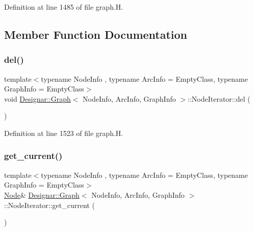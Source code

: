 Definition at line 1485 of file graph.\+H.



\subsection{Member Function Documentation}
\mbox{\label{class_designar_1_1_graph_1_1_node_iterator_a8ff7d2de6b10d3fd60774db675340259}} 
\subsubsection{\texorpdfstring{del()}{del()}}
{\footnotesize\ttfamily template$<$typename Node\+Info , typename Arc\+Info  = Empty\+Class, typename Graph\+Info  = Empty\+Class$>$ \\
void \hyperlink{class_designar_1_1_graph}{Designar\+::\+Graph}$<$ Node\+Info, Arc\+Info, Graph\+Info $>$\+::Node\+Iterator\+::del (\begin{DoxyParamCaption}{ }\end{DoxyParamCaption})\hspace{0.3cm}{\ttfamily [inline]}}



Definition at line 1523 of file graph.\+H.

\mbox{\label{class_designar_1_1_graph_1_1_node_iterator_a79268477058bf2d213dc11581c12a125}} 
\subsubsection{\texorpdfstring{get\+\_\+current()}{get\_current()}\hspace{0.1cm}{\footnotesize\ttfamily [1/2]}}
{\footnotesize\ttfamily template$<$typename Node\+Info , typename Arc\+Info  = Empty\+Class, typename Graph\+Info  = Empty\+Class$>$ \\
\hyperlink{class_designar_1_1_graph_a5dfc7dba9d092ac489c72e40390c37d0}{Node}\& \hyperlink{class_designar_1_1_graph}{Designar\+::\+Graph}$<$ Node\+Info, Arc\+Info, Graph\+Info $>$\+::Node\+Iterator\+::get\+\_\+current (\begin{DoxyParamCaption}{ }\end{DoxyParamCaption})\hspace{0.3cm}{\ttfamily [inline]}}



